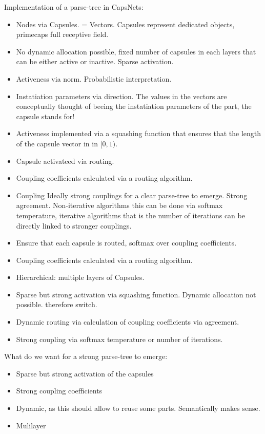 \documentclass{article}
\begin{document}
Implementation of a parse-tree in CapsNets:
\begin{itemize}
	\item Nodes via Capsules. = Vectors. Capsules represent dedicated objects, primecaps full receptive field.
	\item No dynamic allocation possible, fixed number of capsules in each layers that can be either active or inactive. Sparse activation.
	\item Activeness via norm. Probabilistic interpretation.
	\item Instatiation parameters via direction. The values in the vectors are conceptually thought of beeing the instatiation parameters of the part, the capsule stands for!
	\item Activeness implemented via a squashing function that ensures that the length of the capsule vector in in $[0,1)$.
	\item Capsule activateed via routing.
	\item Coupling coefficients calculated via a routing algorithm.
	\item Coupling Ideally strong couplings for a clear parse-tree to emerge. Strong agreement. Non-iterative algorithms this can be done via softmax temperature, iterative algorithms that is the number of iterations can be directly linked to stronger couplings.
	\item Ensure that each capsule is routed, softmax over coupling coefficients.
	\item Coupling coefficients calculated via a routing algorithm.
	\item Hierarchical: multiple layers of Capsules.
	\item Sparse but strong activation via squashing function. Dynamic allocation not possible. therefore switch.
	\item Dynamic routing via calculation of coupling coefficients via agreement.
	\item Strong coupling via softmax temperature or number of iterations.
\end{itemize}

What do we want for a strong parse-tree to emerge:
\begin{itemize}
	\item Sparse but strong activation of the capsules
	\item Strong coupling coefficients
	\item Dynamic, as this should allow to reuse some parts. Semantically makes sense.
	\item Mulilayer
\end{itemize}
\end{document}
